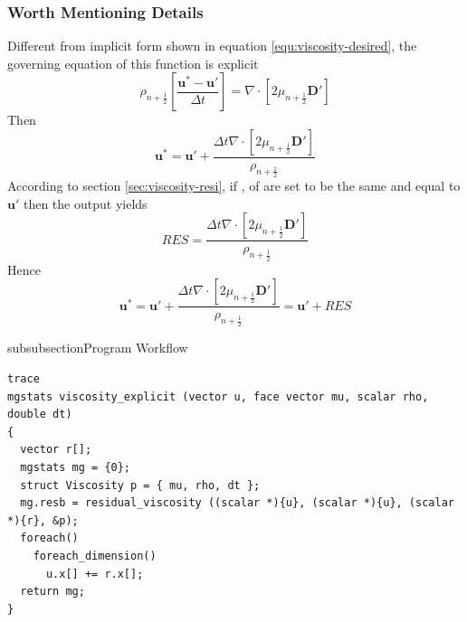 \subsubsection{Worth Mentioning Details}
Different from implicit form shown in equation \ref{equ:viscosity-desired}, the governing equation of this function is explicit
\begin{equation}
  \rho_{n+ \frac{1}{2}}[ \frac{ \mathbf{u}^*- \mathbf{u}'}{\Delta t}] = \nabla\cdot [2\mu_{n+ \frac{1}{2}} \mathbf{D}']
\end{equation}
Then
\begin{equation}
  \mathbf{u}^* = \mathbf{u}' + \frac{\Delta t\nabla\cdot[2 \mu_{n+ \frac{1}{2}} \mathbf{D}']}{\rho_{n + \frac{1}{2}}} 
\end{equation}
According to section \ref{sec:viscosity-resi}, 
if ,  of  are set to be the same and equal to $ \mathbf{u}'$ then the output yields
\begin{equation}
  RES = \frac{\Delta t\nabla\cdot[2 \mu_{n+ \frac{1}{2}} \mathbf{D}']}{\rho_{n + \frac{1}{2}}}
\end{equation}
Hence
\begin{equation}
  \mathbf{u}^* = \mathbf{u}' + \frac{\Delta t\nabla\cdot[2 \mu_{n+ \frac{1}{2}} \mathbf{D}']}{\rho_{n + \frac{1}{2}}}= \mathbf{u}'+ RES 
\end{equation}

\begin{codesection}{subsubsection}{Program Workflow}
\begin{verbatim}
trace
mgstats viscosity_explicit (vector u, face vector mu, scalar rho, double dt)
{
  vector r[];
  mgstats mg = {0};
  struct Viscosity p = { mu, rho, dt };
  mg.resb = residual_viscosity ((scalar *){u}, (scalar *){u}, (scalar *){r}, &p);
  foreach()
    foreach_dimension()
      u.x[] += r.x[];
  return mg;
}
\end{verbatim}
\end{codesection}
\printbibliography